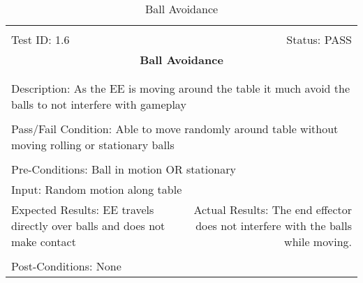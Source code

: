 \documentclass[titlepage]{article}
\begin{document}
\begin{center}
\begin{table}[h!]
\begin{tabular}{|l r|}\hline&\\[-2mm]
	Test ID: 1.6	&Status: PASS\\[-3mm]
	\multicolumn{2}{|c|}{\textbf{\large{Ball Avoidance}}}\\&\\\hline&\\[-3mm]
	\multicolumn{2}{|p{\textwidth}|}{Description: As the EE is moving around the table it much avoid the balls to not interfere with gameplay}\\[1mm]\hline&\\[-3mm]
	\multicolumn{2}{|p{\textwidth}|}{Pass/Fail Condition: Able to move randomly around table without moving rolling or stationary balls}\\[1mm]\hline&\\[-3mm]
	\multicolumn{2}{|p{\textwidth}|}{Pre-Conditions: Ball in motion OR stationary}\\[4mm]
	\multicolumn{2}{|p{\textwidth}|}{Input: Random motion along table}\\[2mm]\hline
	\multicolumn{1}{|p{0.49\textwidth}}{Expected Results: EE travels directly over balls and does not make contact}	&\multicolumn{1}{|p{0.45\textwidth}|}{Actual Results: The end effector does not interfere with the balls while moving.}\\\hline&\\[-3mm]
	\multicolumn{2}{|p{\textwidth}|}{Post-Conditions: None}\\\hline
\end{tabular}
\caption{Ball Avoidance}
\end{table}
\end{center}
\newpage
\end{document}
